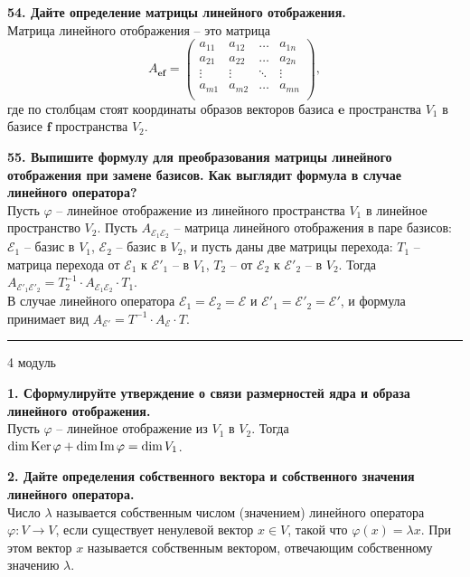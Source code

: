 \documentclass[11pt,a4paper]{article}
\newcommand{\e}{\mathbf{e}}
\renewcommand{\f}{\mathbf{f}}
\newcommand{\E}{\mathcal{E}}
\newcommand{\Ker}[1]{\mathrm{Ker}\hspace{0.5mm}#1}
\renewcommand{\Im}[1]{\mathrm{Im}\hspace{0.5mm}#1}
\newcommand{\Dim}[1]{\mathrm{dim}\hspace{0.5mm}#1}
\begin{document}
\textbf{54. Дайте определение матрицы линейного отображения.\\}
Матрица линейного отображения -- это матрица $$A_{\e\f} =
\left( \begin{matrix}
a_{11} & a_{12} & \hdots & a_{1n} \\
a_{21} & a_{22} & \hdots & a_{2n} \\
\vdots & \vdots & \ddots & \vdots \\
a_{m1} & a_{m2} & \hdots & a_{mn} \\
\end{matrix} \right),$$
где по столбцам стоят координаты образов векторов базиса $\e$ пространства $V_1$ в базисе $\f$ пространства $V_2$.
\pagebreak

\textbf{55. Выпишите формулу для преобразования матрицы линейного отображения при замене базисов. Как выглядит формула в случае линейного оператора?\\}
Пусть $\varphi$ -- линейное отображение из линейного пространства $V_1$ в линейное пространство $V_2$. Пусть $A_{\E_1 \E_2}$ -- матрица линейного отображения в паре базисов: $\E_1$ -- базис в $V_1$, $\E_2$ -- базис в $V_2$, и пусть даны две матрицы перехода: $T_1$ -- матрица перехода от $\E_1$ к $\E'_1$ -- в $V_1$,  $T_2$ -- от $\E_2$ к $\E'_2$ -- в $V_2$. Тогда $A_{\E'_1 \E'_2} = T_2^{-1} \cdot A_{\E_1 \E_2} \cdot T_1$.\\
В случае линейного оператора $\E_1 = \E_2 = \E$ и $\E'_1 = \E'_2 = \E'$, и формула принимает вид $A_{\E'} = T^{-1} \cdot A_{\E} \cdot T$.

\rule{\linewidth}{0.3mm}

\vspace{1mm}
\begin{center}
\begin{LARGE}
\textsf{4 модуль}
\end{LARGE}
\end{center}
\vspace{1mm}

\textbf{1. Сформулируйте утверждение о связи размерностей ядра и образа линейного отображения.\\}
Пусть $\varphi$ -- линейное отображение из $V_1$ в $V_2$. Тогда $\Dim{\Ker{\varphi}} + \Dim{\Im{\varphi}} = \Dim{V_1}$.

\textbf{2. Дайте определения собственного вектора и собственного значения линейного оператора.\\}
Число $\lambda$ называется собственным числом (значением) линейного оператора $\varphi : V \rightarrow V$, если существует ненулевой вектор $x \in V$, такой что $\varphi (x) = \lambda x$. При этом вектор $x$ называется собственным вектором, отвечающим собственному значению $\lambda$.
\end{document}
